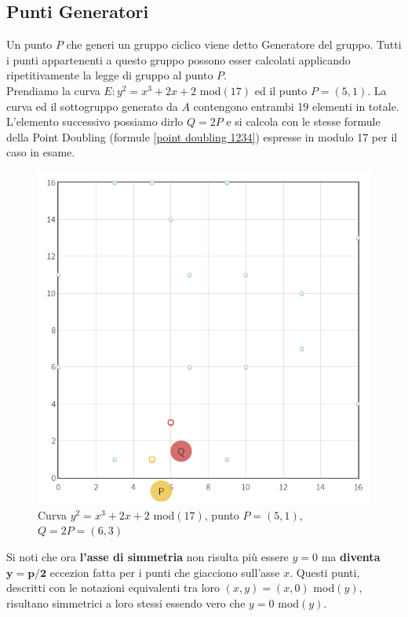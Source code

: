 \documentclass[a4paper,12pt]{tesiinfo}
\begin{document}
\subsection{Punti Generatori}
Un punto $P$ che generi un gruppo ciclico viene detto Generatore del gruppo. Tutti i punti appartenenti a questo gruppo possono esser calcolati applicando ripetitivamente la legge di gruppo al punto $P$. 
\\
Prendiamo la curva $E: y^2 = x^3 +2x +2$ mod$(17)$ ed il punto $P = (5, 1)$. La curva ed il sottogruppo generato da $A$ contengono entrambi 19 elementi in totale. L'elemento successivo possiamo dirlo $Q=2P$ e si calcola con le stesse formule della Point Doubling (formule \ref{point doubling 1234}) espresse in modulo 17 per il caso in esame.
\begin{figure}[H] 
    \includegraphics[scale=0.5, center]{PD_mod(17)} 
    \caption{Curva $y^2=x^3+2x+2$ mod$(17)$, punto $P = (5, 1)$, $Q=2P = (6, 3)$} 
\end{figure} 
Si noti che ora \textbf{l'asse di simmetria} non risulta pi\`u essere $y=0$ ma \textbf{diventa} $\mathbold{y=p\big / 2}$ eccezion fatta per i punti che giacciono sull'asse $x$. Questi punti, descritti con le notazioni equivalenti tra loro $(x, y)=(x, 0)$ mod$(y)$, risultano simmetrici a loro stessi essendo vero che $y=0$ mod$(y)$.
\\
\end{document}
